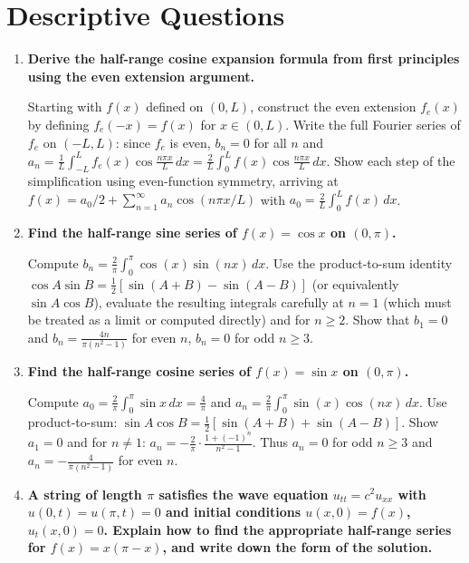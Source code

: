 \documentclass[12pt,a4paper]{article}
\begin{document}
\section{Descriptive Questions}

\begin{enumerate}[leftmargin=*, label=\textbf{Q\arabic*.}]

\item \textbf{Derive the half-range cosine expansion formula from first principles using the even extension argument.}

Starting with $f(x)$ defined on $(0,L)$, construct the even extension $f_e(x)$ by defining $f_e(-x)=f(x)$ for $x\in(0,L)$. Write the full Fourier series of $f_e$ on $(-L,L)$: since $f_e$ is even, $b_n = 0$ for all $n$ and $a_n = \frac{1}{L}\int_{-L}^L f_e(x)\cos\frac{n\pi x}{L}\,dx = \frac{2}{L}\int_0^L f(x)\cos\frac{n\pi x}{L}\,dx$. Show each step of the simplification using even-function symmetry, arriving at $f(x) = a_0/2 + \sum_{n=1}^{\infty}a_n\cos(n\pi x/L)$ with $a_0 = \frac{2}{L}\int_0^L f(x)\,dx$.

\item \textbf{Find the half-range sine series of $f(x) = \cos x$ on $(0,\pi)$.}

Compute $b_n = \frac{2}{\pi}\int_0^{\pi}\cos(x)\sin(nx)\,dx$. Use the product-to-sum identity $\cos A\sin B = \frac{1}{2}[\sin(A+B) - \sin(A-B)]$ (or equivalently $\sin A \cos B$), evaluate the resulting integrals carefully at $n=1$ (which must be treated as a limit or computed directly) and for $n\geq 2$. Show that $b_1 = 0$ and $b_n = \frac{4n}{\pi(n^2-1)}$ for even $n$, $b_n = 0$ for odd $n\geq 3$.

\item \textbf{Find the half-range cosine series of $f(x) = \sin x$ on $(0,\pi)$.}

Compute $a_0 = \frac{2}{\pi}\int_0^{\pi}\sin x\,dx = \frac{4}{\pi}$ and $a_n = \frac{2}{\pi}\int_0^{\pi}\sin(x)\cos(nx)\,dx$. Use product-to-sum: $\sin A\cos B = \frac{1}{2}[\sin(A+B)+\sin(A-B)]$. Show $a_1 = 0$ and for $n\neq 1$: $a_n = -\frac{2}{\pi}\cdot\frac{1+(-1)^n}{n^2-1}$. Thus $a_n=0$ for odd $n\geq3$ and $a_n = -\frac{4}{\pi(n^2-1)}$ for even $n$.

\item \textbf{A string of length $\pi$ satisfies the wave equation $u_{tt}=c^2 u_{xx}$ with $u(0,t)=u(\pi,t)=0$ and initial conditions $u(x,0)=f(x)$, $u_t(x,0)=0$. Explain how to find the appropriate half-range series for $f(x)=x(\pi-x)$, and write down the form of the solution.}


\end{enumerate}
\end{document}
